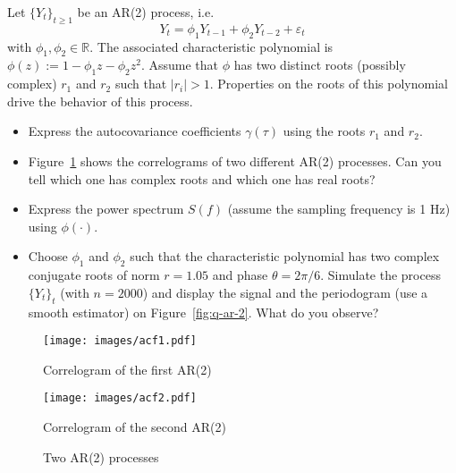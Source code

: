 \documentclass[11pt]{article}
\begin{document}
\newpage
\begin{exercise}[subtitle=AR(2) process]
Let $\{Y_t\}_{t\geq 1}$ be an AR(2) process, i.e.
\begin{equation}
    Y_t = \phi_1 Y_{t-1} + \phi_2 Y_{t-2} + \varepsilon_t
\end{equation}
with $\phi_1, \phi_2\in\mathbb{R}$.
The associated characteristic polynomial is $\phi(z):=1-\phi_1 z - \phi_2 z^2$.
Assume that $\phi$ has two distinct roots (possibly complex) $r_1$ and $r_2$ such that $|r_i|>1$.
Properties on the roots of this polynomial drive the behavior of this process.


\begin{itemize}
    \item Express the autocovariance coefficients $\gamma(\tau)$ using the roots $r_1$ and $r_2$.
    \item Figure~\ref{fig:q-ar-2-corr} shows the correlograms of two different AR(2) processes. Can you tell which one has complex roots and which one has real roots?
    \item Express the power spectrum $S(f)$ (assume the sampling frequency is 1 Hz) using $\phi(\cdot)$.
    \item Choose $\phi_1$ and $\phi_2$ such that the characteristic polynomial has two complex conjugate roots of norm $r=1.05$ and phase $\theta=2\pi/6$. Simulate the process $\{Y_t\}_t$ (with $n=2000$) and display the signal and the periodogram (use a smooth estimator) on Figure~\ref{fig:q-ar-2}. What do you observe?
\end{itemize}


\begin{figure}
    \centering
    \begin{minipage}[t]{0.45\textwidth}
    \centerline{\texttt{[image: images/acf1.pdf]}}
    \centerline{Correlogram of the first AR(2)}
    \end{minipage}
    \hfill
    \begin{minipage}[t]{0.45\textwidth}    \centerline{\texttt{[image: images/acf2.pdf]}}
    \centerline{Correlogram of the second AR(2)}
    \end{minipage}
    \caption{Two AR(2) processes}\label{fig:q-ar-2-corr}
\end{figure}



\end{exercise}
\end{document}
